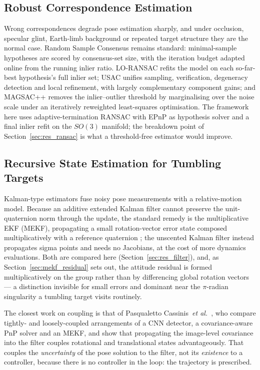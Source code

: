 \subsection{Robust Correspondence Estimation}
\label{sec:rw_ransac}

Wrong correspondences degrade pose estimation sharply, and under occlusion,
specular glint, Earth-limb background or repeated target structure they are
the normal case. Random Sample Consensus \cite{fischler1981ransac} remains
standard: minimal-sample hypotheses are scored by consensus-set size, with the
iteration budget adapted online from the running inlier ratio. LO-RANSAC
\cite{chum2003loransac} refits the model on each so-far-best hypothesis's full
inlier set; USAC \cite{raguram2013usac} unifies sampling, verification,
degeneracy detection and local refinement, with largely complementary
component gains; and MAGSAC++ \cite{barath2020magsacpp} removes the
inlier--outlier threshold by marginalising over the noise scale under an
iteratively reweighted least-squares optimisation. The framework here uses
adaptive-termination RANSAC with EPnP as hypothesis solver and a final inlier
refit on the $SO(3)$ manifold; the breakdown point of
Section~\ref{sec:res_ransac} is what a threshold-free estimator would improve.

\subsection{Recursive State Estimation for Tumbling Targets}
\label{sec:rw_filter}

Kalman-type estimators fuse noisy pose measurements with a relative-motion
model. Because an additive extended Kalman filter cannot preserve the
unit-quaternion norm through the update, the standard remedy is the
multiplicative EKF (MEKF), propagating a small rotation-vector error state
composed multiplicatively with a reference quaternion \cite{markley2003}; the
unscented Kalman filter \cite{julier2004} instead propagates sigma points and
needs no Jacobians, at the cost of more dynamics evaluations. Both are
compared here (Section~\ref{sec:res_filter}), and, as
Section~\ref{sec:mekf_residual} sets out, the attitude residual is formed
multiplicatively on the group rather than by differencing global rotation
vectors --- a distinction invisible for small errors and dominant near the
$\pi$-radian singularity a tumbling target visits routinely.

The closest work on coupling is that of Pasqualetto Cassinis~\textit{et
al.}~\cite{cassinis2021coupled}, who compare tightly- and loosely-coupled
arrangements of a CNN detector, a covariance-aware PnP solver and an MEKF, and
show that propagating the image-level covariance into the filter couples
rotational and translational states advantageously. That couples the
\emph{uncertainty} of the pose solution to the filter, not its
\emph{existence} to a controller, because there is no controller in the loop:
the trajectory is prescribed.

